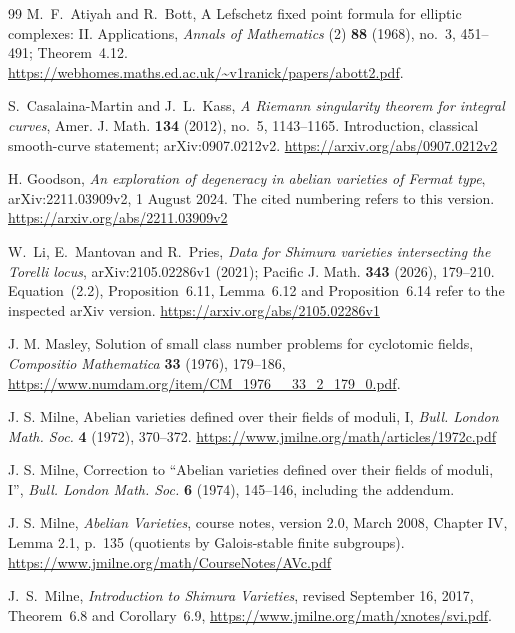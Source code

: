\begin{thebibliography}{99}
M.~F.~Atiyah and R.~Bott, A Lefschetz fixed point formula for elliptic
complexes: II. Applications, \emph{Annals of Mathematics} (2)
\textbf{88} (1968), no.~3, 451--491; Theorem~4.12.
\url{https://webhomes.maths.ed.ac.uk/~v1ranick/papers/abott2.pdf}.


S.~Casalaina-Martin and J.~L.~Kass,
\emph{A Riemann singularity theorem for integral curves},
Amer. J. Math. \textbf{134} (2012), no.~5, 1143--1165.
Introduction, classical smooth-curve statement; arXiv:0907.0212v2.
\url{https://arxiv.org/abs/0907.0212v2}

H. Goodson,
\emph{An exploration of degeneracy in abelian varieties of Fermat type},
arXiv:2211.03909v2, 1 August 2024.
The cited numbering refers to this version.
\url{https://arxiv.org/abs/2211.03909v2}

W.~Li, E.~Mantovan and R.~Pries,
\emph{Data for Shimura varieties intersecting the Torelli locus},
arXiv:2105.02286v1 (2021); Pacific J. Math. \textbf{343} (2026), 179--210.
Equation~(2.2), Proposition~6.11, Lemma~6.12 and Proposition~6.14
refer to the inspected arXiv version.
\url{https://arxiv.org/abs/2105.02286v1}

J. M. Masley,
Solution of small class number problems for cyclotomic fields,
\emph{Compositio Mathematica} \textbf{33} (1976), 179--186,
\url{https://www.numdam.org/item/CM_1976__33_2_179_0.pdf}.

J. S. Milne,
Abelian varieties defined over their fields of moduli, I,
\emph{Bull. London Math. Soc.} \textbf{4} (1972), 370--372.
\url{https://www.jmilne.org/math/articles/1972c.pdf}

J. S. Milne,
Correction to ``Abelian varieties defined over their fields of moduli, I'',
\emph{Bull. London Math. Soc.} \textbf{6} (1974), 145--146,
including the addendum.

J. S. Milne,
\emph{Abelian Varieties}, course notes, version 2.0, March 2008,
Chapter IV, Lemma 2.1, p.~135 (quotients by Galois-stable finite subgroups).
\url{https://www.jmilne.org/math/CourseNotes/AVc.pdf}

J.~S.~Milne, \emph{Introduction to Shimura Varieties},
revised September 16, 2017, Theorem~6.8 and Corollary~6.9,
\url{https://www.jmilne.org/math/xnotes/svi.pdf}.


\end{thebibliography}
